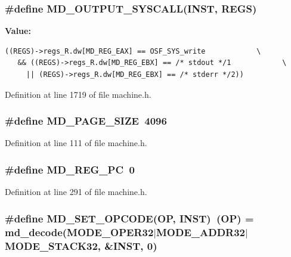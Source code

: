 \subsubsection[{MD\_\-OUTPUT\_\-SYSCALL}]{\setlength{\rightskip}{0pt plus 5cm}\#define MD\_\-OUTPUT\_\-SYSCALL(INST, \/  REGS)}\label{machine_8h_a99f44802053357e3f8fa76ec4b18875}


\textbf{Value:}

\begin{Code}\begin{verbatim}((REGS)->regs_R.dw[MD_REG_EAX] == OSF_SYS_write            \
   && ((REGS)->regs_R.dw[MD_REG_EBX] == /* stdout */1            \
     || (REGS)->regs_R.dw[MD_REG_EBX] == /* stderr */2))
\end{verbatim}
\end{Code}


Definition at line 1719 of file machine.h.
\subsubsection[{MD\_\-PAGE\_\-SIZE}]{\setlength{\rightskip}{0pt plus 5cm}\#define MD\_\-PAGE\_\-SIZE~4096}\label{machine_8h_8a1b6a6176ef2fd3e359b70042374ff0}




Definition at line 111 of file machine.h.
\subsubsection[{MD\_\-REG\_\-PC}]{\setlength{\rightskip}{0pt plus 5cm}\#define MD\_\-REG\_\-PC~0}\label{machine_8h_e8ea123a1ba524d6eb2c78b6887f432c}




Definition at line 291 of file machine.h.
\subsubsection[{MD\_\-SET\_\-OPCODE}]{\setlength{\rightskip}{0pt plus 5cm}\#define MD\_\-SET\_\-OPCODE(OP, \/  INST)~(OP) = md\_\-decode(MODE\_\-OPER32$|$MODE\_\-ADDR32$|$MODE\_\-STACK32, \&INST, 0)}\label{machine_8h_045c7a410476a18c9c25a8ef46037031}




